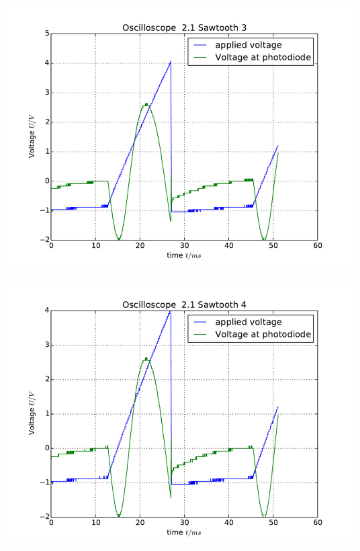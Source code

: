 \begin{figure}
\begin{subfigure}[b]{\picwidth}
        \includegraphics[width=\textwidth]{analysis/figures/21sawtooth3}
        \caption{}
    \end{subfigure}
    \begin{subfigure}[b]{\picwidth}
        \includegraphics[width=\textwidth]{analysis/figures/21sawtooth4}
        \caption{}
    \end{subfigure}
    \begin{subfigure}[b]{\picwidth}

\end{subfigure}
\end{figure}
